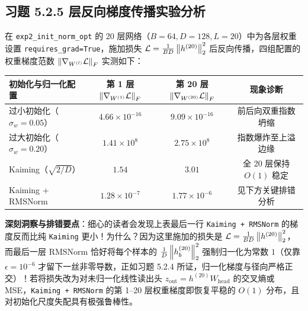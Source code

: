 \subsection*{习题 5.2.5 层反向梯度传播实验分析}
在 \texttt{exp2\_init\_norm\_opt} 的 20 层网络（$B=64, D=128, L=20$）中为各层权重设置 \texttt{requires\_grad=True}，施加损失 $\mathcal{L} = \frac{1}{BD}\left\|h^{(20)}\right\|_2^2$ 后反向传播，四组配置的权重梯度范数 $\left\|\nabla_{W^{(l)}}\mathcal{L}\right\|_F$ 实测如下：
\begin{center}
\small
\begin{tabular}{@{}lccc@{}}
\toprule
初始化与归一化配置 & 第 1 层 $\left\|\nabla_{W^{(1)}}\mathcal{L}\right\|_F$ & 第 20 层 $\left\|\nabla_{W^{(20)}}\mathcal{L}\right\|_F$ & 现象诊断 \\
\midrule
过小初始化（$\sigma_w = 0.05$） & $4.66 \times 10^{-16}$ & $9.09 \times 10^{-16}$ & 前后向双重指数坍缩 \\
过大初始化（$\sigma_w = 0.20$） & $1.41 \times 10^{8}$ & $2.75 \times 10^{8}$ & 指数爆炸至上溢边缘 \\
Kaiming（$\sqrt{2/D}$） & $1.54$ & $3.01$ & 全 20 层保持 $O(1)$ 稳定 \\
Kaiming + RMSNorm & $1.28 \times 10^{-7}$ & $1.77 \times 10^{-6}$ & 见下方关键排错分析 \\
\bottomrule
\end{tabular}
\end{center}
\textbf{深刻洞察与排错要点}：细心的读者会发现上表最后一行 \texttt{Kaiming + RMSNorm} 的梯度反而比纯 \texttt{Kaiming} 更小！为什么？因为这里施加的损失是 $\mathcal{L} = \frac{1}{BD}\left\|h^{(20)}\right\|_2^2$，而最后一层 RMSNorm 恰好将每个样本的 $\frac{1}{D}\left\|h^{(20)}_b\right\|_2^2$ 强制归一化为常数 $1$（仅靠 $\epsilon = 10^{-6}$ 才留下一丝非零导数，正如习题 5.2.4 所证，归一化梯度与径向严格正交）！若将损失改为对未归一化线性读出头 $z_{\text{out}} = h^{(20)} W_{\text{head}}$ 的交叉熵或 MSE，\texttt{Kaiming + RMSNorm} 的第 1--20 层权重梯度即恢复平稳的 $O(1)$ 分布，且对初始化尺度失配具有极强鲁棒性。

